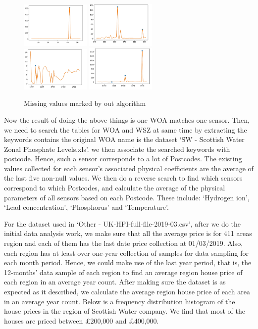 \documentclass[11pt,twoside]{article}
\numberwithin{Theorem}{section}
\numberwithin{Definition}{section}
\numberwithin{Lemma}{section}
\numberwithin{Algorithm}{section}
\numberwithin{equation}{section}
\begin{document}
\begin{figure}[!ht]
    \centering
    \includegraphics[width=0.3\textwidth]{p4.png}
    \includegraphics[width=0.3\textwidth]{p5.png}\\
    \includegraphics[width=0.3\textwidth]{p6.png}
    \includegraphics[width=0.3\textwidth]{p7.png}
    \caption{Missing values marked by out algorithm}
    \end{figure}

Now the result of doing the above things is one WOA matches one sensor. Then, we need to search the tables for WOA and WSZ at same time by extracting the keywords contains the original WOA name is the dataset `SW - Scottish Water Zonal Phosphate Levels.xls'. we then associate the searched keywords with postcode. Hence, such a sensor corresponds to a lot of Postcodes. The existing values collected for each sensor's associated physical coefficients are the average of the last five non-null values. We then do a reverse search to find which sensors correspond to which Postcodes, and calculate the average of the physical parameters of all sensors based on each Postcode. These include: `Hydrogen ion', `Lead concentration', `Phosphorus' and `Temperature'.

For the dataset used in `Other - UK-HPI-full-file-2019-03.csv', after we do the initial data analysis work, we make sure that all the average price is for 411 areas region and each of them has the last date price collection at 01/03/2019. Also, each region has at least over one-year collection of samples for data sampling for each month period. Hence, we could make use of the last year period, that is, the 12-months' data sample of each region to find an average region house price of each region in an average year count. After making sure the dataset is as expected as it described, we calculate the average region house price of each area in an average year count. Below is a frequency distribution histogram of the house prices in the region of Scottish Water company. We find that most of the houses are priced between £200,000 and £400,000.
\end{document}
